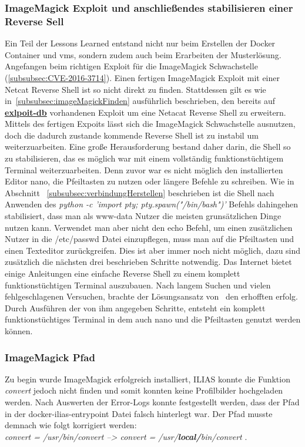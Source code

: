 \documentclass[10pt, a4paper,onecolumn ,titlepage]{article}
\begin{document}
    \subsubsection{ImageMagick Exploit und anschließendes stabilisieren einer Reverse Sell}
    \label{subsubsec:lessonslearnedShell}
    Ein Teil der Lessons Learned entstand nicht nur beim Erstellen der Docker Container und \ac{vm}s, sondern zudem auch beim Erarbeiten der Musterlösung.
    Angefangen beim richtigen Exploit für die ImageMagick Schwachstelle (\ref{subsubsec:CVE-2016-3714}).
    Einen fertigen ImageMagick Exploit mit einer Netcat Reverse Shell ist so nicht direkt zu finden.
    Stattdessen gilt es wie in~\ref{subsubsec:imageMagickFinden} ausführlich beschrieben, den bereits auf \href{https://www.exploit-db.com/exploits/39767}{\textbf{exlpoit-db}} vorhandenen Exploit um eine Netacat Reverse Shell zu erweitern.
    Mittels des fertigen Expoits lässt sich die ImageMagick Schwachstelle ausnutzen, doch die dadurch zustande kommende Reverse Shell ist zu instabil um weiterzuarbeiten.
    Eine große Herausforderung bestand daher darin, die Shell so zu stabilisieren, das es möglich war mit einem vollständig funktionstüchtigem Terminal weiterzuarbeiten.
    Denn zuvor war es nicht möglich den installierten Editor nano, die Pfeiltasten zu nutzen oder längere Befehle zu schreiben.
    Wie in Abschnitt ~\ref{subsubsec:verbindungHerstellen} beschrieben ist die Shell nach Anwenden des \textit{python -c 'import pty; pty.spawn("/bin/bash")'} Befehls dahingehen stabilisiert, dass man als www-data Nutzer die meisten grunsätzlichen Dinge nutzen kann.
    Verwendet man aber nicht den echo Befehl, um einen zusätzlichen Nutzer in die /etc/passwd Datei einzupflegen, muss man auf die Pfeiltasten und einen Texteditor zurückgreifen.
    Dies ist aber immer noch nicht möglich, dazu sind zusätzlich die nächsten drei beschrieben Schritte notwendig.
    Das Internet bietet einige Anleitungen eine einfache Reverse Shell zu einem komplett funktionstüchtigen Terminal auszubauen.
    Nach langem Suchen und vielen fehlgeschlagenen Versuchen, brachte der Lösungsansatz von~\textcite{shellStabilisieren} den erhofften erfolg.
    Durch Ausführen der von ihm angegeben Schritte, entsteht ein komplett funktionstüchtiges Terminal in dem auch nano und die Pfeiltasten genutzt werden können.


    \subsubsection{ImageMagick Pfad}
    \label{subsubsec:lessonslearnedPath}
    Zu begin wurde ImageMagick erfolgreich installiert, ILIAS konnte die Funktion \textit{convert} jedoch nicht finden und somit konnten keine Profilbilder hochgeladen werden.
    Nach Auswerten der Error-Logs konnte festgestellt werden, dass der Pfad in der docker-ilias-entrypoint Datei falsch hinterlegt war.
    Der Pfad musste demnach wie folgt korrigiert werden:
    \\
    \textit{
        convert = /usr/bin/convert
        -->
        convert = /usr/\textbf{local/}bin/convert
    }.
\end{document}
